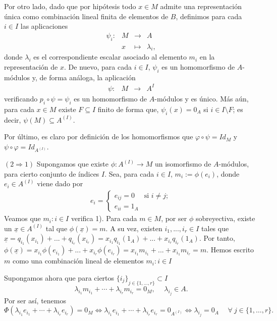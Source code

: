 \documentclass[a4paper,12pt]{article}
\theoremstyle{definition}
\begin{document}
Por otro lado, dado que por hipótesis todo $x\in M$ admite una representación única como combinación lineal finita de elementos de $B$, definimos para cada $i\in I$ las aplicaciones
$$\begin{array}{rccl}
    \psi_i:&M&\longrightarrow&A\\
    &x&\longmapsto&\lambda_i,
\end{array}$$
donde $\lambda_i$ es el correspondiente escalar asociado al elemento $m_i$ en la representación de $x$. De nuevo, para cada $i\in I$, $\psi_i$ es un homomorfismo de $A$-módulos y, de forma análoga, la aplicación
$$\begin{array}{rccl}
    \psi:&M&\longrightarrow&A^I
\end{array}$$
verificando $p_i\circ\psi=\psi_i$ es un homomorfismo de $A$-módulos y es único. Más aún, para cada $x\in M$ existe $F\subseteq I$ finito de forma que, $\psi_i(x)=0_A$ si $i\in I\setminus F$; es decir, $\psi(M)\subseteq A^{(I)}$. 

Por último, es claro por definición de los homomorfismos que $\varphi\circ\psi=Id_{M}$ y $\psi\circ\varphi=Id_{A^{(I)}}$.

$(2\Rightarrow 1)$ Supongamos que existe $\phi: A^{(I)}\rightarrow M$ un isomorfismo de $A$-módulos, para cierto conjunto de índices $I$. Sea, para cada $i\in I$, $m_i:=\phi(e_i)$, donde $e_i\in A^{(I)}$ viene dado por
$$\begin{array}{rccl}
    e_i= \left\{ \begin{array}{ll}
         e_{ij}=0 & \mbox{si $i\neq j$};\\
         e_{ii}=1_A & \mbox{}\end{array} \right.
\end{array}$$    
Veamos que ${m_i:i\in I}$ verifica 1). Para cada $m\in M$, por ser $\phi$ sobreyectiva, existe un $\underline{x}\in A^{(I)}$ tal que $\phi(\underline{x})=m$. A su vez, existen $i_1,...,i_r\in I$ tales que $\underline{x}=q_{i_1}(x_{i_1})+...+q_{i_r}(x_{i_r})=x_{i_1}q_{i_1}(1_A)+...+x_{i_r}q_{i_r}(1_A)$. Por tanto, $\phi(\underline{x})=x_{i_1}\phi(e_{i_1})+...+x_{i_r}\phi(e_{i_r})=x_{i_1}m_{i_1}+...+x_{i_1}m_{i_r}=m$. Hemos escrito $m$ como una combinación lineal de elementos ${m_i:i\in I}$

Supongamos ahora que para ciertos ${\{i_j\}}_{j\in\{1,\dots,r\}}\subset I$$$\lambda_{i_1}m_{i_1}+\cdots+\lambda_{i_r}m_{i_r}=0_M,\hspace{15pt}\lambda_{i_j}\in A.$$
Por ser así, tenemos
$$\Phi(\lambda_{i_1}e_{i_1}+\cdots+\lambda_{i_r}e_{i_r})=0_M\Longleftrightarrow\lambda_{i_1}e_{i_1}+\cdots+\lambda_{i_r}e_{i_r}=0_{A^{(I)}}\Longleftrightarrow\lambda_{i_j}=0_A\hspace{15pt}\forall\ j\in\{1,\dots,r\}.$$
\end{document}
